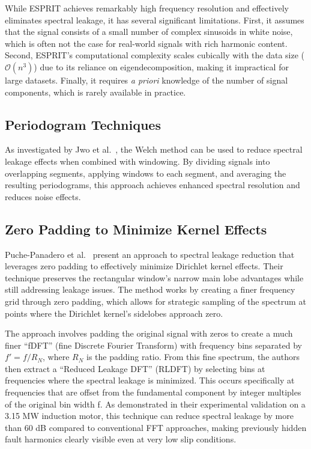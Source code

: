 \documentclass[11pt,twoside]{report}
\numberwithin{thm}{section}
\numberwithin{equation}{section}
\begin{document}
While ESPRIT achieves remarkably high frequency resolution and effectively eliminates spectral leakage, it has several significant limitations. First, it assumes that the signal consists of a small number of complex sinusoids in white noise, which is often not the case for real-world signals with rich harmonic content. Second, ESPRIT's computational complexity scales cubically with the data size ($\mathcal{O}(n^3)$) due to its reliance on eigendecomposition, making it impractical for large datasets. Finally, it requires \textit{a priori} knowledge of the number of signal components, which is rarely available in practice.

\subsection{Periodogram Techniques}

As investigated by Jwo et al.~\cite{jwo2019windowing}, the Welch method can be used to reduce spectral leakage effects when combined with windowing. By dividing signals into overlapping segments, applying windows to each segment, and averaging the resulting periodograms, this approach achieves enhanced spectral resolution and reduces noise effects.

\subsection{Zero Padding to Minimize Kernel Effects}
Puche-Panadero et al.~\cite{9345707} present an approach to spectral leakage reduction that leverages zero padding to effectively minimize Dirichlet kernel effects. Their technique preserves the rectangular window's narrow main lobe advantages while still addressing leakage issues. The method works by creating a finer frequency grid through zero padding, which allows for strategic sampling of the spectrum at points where the Dirichlet kernel's sidelobes approach zero.

The approach involves padding the original signal with zeros to create a much finer ``fDFT'' (fine Discrete Fourier Transform) with frequency bins separated by $f'= f/R_N$, where $R_N$ is the padding ratio. From this fine spectrum, the authors then extract a ``Reduced Leakage DFT'' (RLDFT) by selecting bins at frequencies where the spectral leakage is minimized. This occurs specifically at frequencies that are offset from the fundamental component by integer multiples of the original bin width f. As demonstrated in their experimental validation on a 3.15 MW induction motor, this technique can reduce spectral leakage by more than 60 dB compared to conventional FFT approaches, making previously hidden fault harmonics clearly visible even at very low slip conditions.
\end{document}

